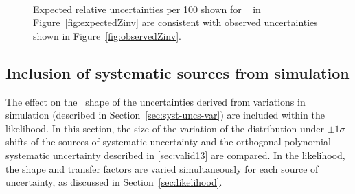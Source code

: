 \begin{figure}[h!]
  \centering
  ~~
  \\
  \caption{\label{fig:expectedObservedZinv}Expected relative uncertainties per 100 \GeV shown for \zInv~ in Figure~\ref{fig:expectedZinv} are consistent
  with observed uncertainties shown in Figure~\ref{fig:observedZinv}.}
\end{figure}



\newpage
\subsection{Inclusion of systematic sources from simulation}
\label{sec:mcSystStudiesShape}

The effect on the \mht~shape of the uncertainties derived from variations in simulation 
(described in Section~\ref{sec:syst-uncs-var}) are included within the likelihood.
In this section, the size of the variation of the \mht distribution under $\pm1\sigma$ shifts of the
sources of systematic uncertainty and the orthogonal polynomial systematic uncertainty
described in \ref{sec:valid13} are compared. In the likelihood, the \mht shape and transfer factors
are varied simultaneously for each source of uncertainty, as discussed in Section~\ref{sec:likelihood}.

